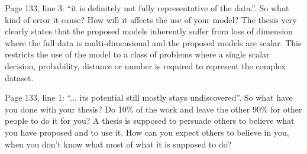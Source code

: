 \replyToComment
    {
      Page 133, line 3: ``it is definitely not fully representative of the data.''.
      So what kind of error it cause?
      How will it affects the use of your model?
    }
    {
      The thesis very clearly states %
       that the proposed models inherently suffer from loss of dimension where the full data is multi-dimensional and the proposed models are scalar.
      This restricts the use of the model to a class of problems where a single scalar decision, probability, distance or number is required to represent the complex dataset.
    }

\replyToComment
    {
      Page 133, line 1: ``... its potential still mostly stays undiscovered''.
      So what have you done with your thesis?
      Do 10\% of the work and leave the other 90\% for other people to do it for you?
      A thesis is supposed to persuade others to believe what you have proposed and to use it.
      How can you expect others to believe in you, when you don't know what most of what it is supposed to do?
    }
